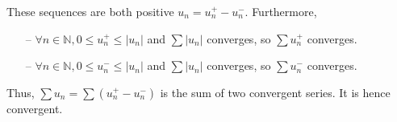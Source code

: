 \documentclass[notitlepage]{math}
\begin{document}
\noindent These sequences are both positive $u_n = u_n^+ - u_n^-$. Furthermore, 
\begin{itemize}
    \item[--] $\forall n \in \mathbb{N}, 0 \leq u_n^+ \leq \left\lvert u_n \right\rvert$ and $\sum \left\lvert u_n \right\rvert$ converges, so $\sum u_n^+$ converges.
    \item[--] $\forall n \in \mathbb{N}, 0 \leq u_n^- \leq \left\lvert u_n \right\rvert$ and $\sum \left\lvert u_n \right\rvert$ converges, so $\sum u_n^-$ converges.
\end{itemize}
Thus, $\sum u_n = \sum \left(u_n^+ - u_n^-\right)$ is the sum of two convergent series. It is hence convergent.\\[1em]

\end{document}
